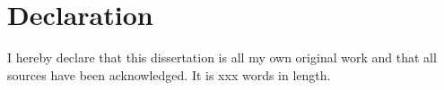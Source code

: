 \chapter*{Declaration}
I hereby declare that this dissertation is all my own
original work and that all sources have
been acknowledged. It is xxx words in
length.